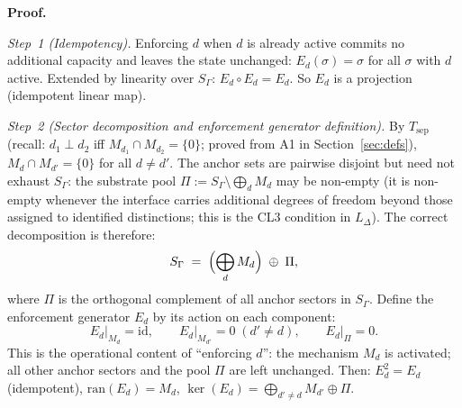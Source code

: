 \documentclass[11pt]{article}
\theoremstyle{remark}
\begin{document}
\begin{tcolorbox}[apfbox, title={Theorem $T_{\mathrm{adj}}$ --- Bridge Step 1: $*$-Involution from Cost Symmetry}]
\smallskip\noindent\textbf{Proof.}

\textit{Step~1 (Idempotency).}  Enforcing $d$ when $d$ is already active commits no additional capacity and leaves the state unchanged: $E_d(\sigma) = \sigma$ for all $\sigma$ with $d$ active.  Extended by linearity over $S_\Gamma$: $E_d \circ E_d = E_d$.  So $E_d$ is a projection (idempotent linear map).

\textit{Step~2 (Sector decomposition and enforcement generator definition).}  By $T_{\mathrm{sep}}$ (recall: $d_1 \perp d_2$ iff $M_{d_1} \cap M_{d_2} = \{0\}$; proved from A1 in Section~\ref{sec:defs}), $M_d \cap M_{d'} = \{0\}$ for all $d \ne d'$.  The anchor sets are pairwise disjoint but need not exhaust $S_\Gamma$: the substrate pool $\Pi := S_\Gamma \setminus \bigoplus_d M_d$ may be non-empty (it is non-empty whenever the interface carries additional degrees of freedom beyond those assigned to identified distinctions; this is the CL3 condition in $L_\Delta$).  The correct decomposition is therefore:
\[
S_\Gamma \;=\; \Bigl(\bigoplus_d M_d\Bigr) \;\oplus\; \Pi,
\]
where $\Pi$ is the orthogonal complement of all anchor sectors in $S_\Gamma$.  Define the enforcement generator $E_d$ by its action on each component:
\[
E_d\big|_{M_d} = \mathrm{id}, \qquad E_d\big|_{M_{d'}} = 0 \;(d' \ne d), \qquad E_d\big|_{\Pi} = 0.
\]
This is the operational content of ``enforcing $d$'': the mechanism $M_d$ is activated; all other anchor sectors and the pool $\Pi$ are left unchanged.  Then: $E_d^2 = E_d$ (idempotent), $\mathrm{ran}(E_d) = M_d$, $\ker(E_d) = \bigoplus_{d' \ne d} M_{d'} \oplus \Pi$.


\end{tcolorbox}
\end{document}
